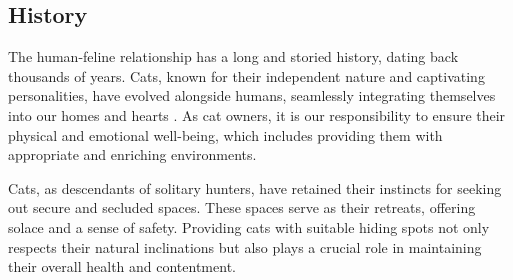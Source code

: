 \subsection{History}

The human-feline relationship has a long and storied history, dating back thousands of years. Cats, known for their independent nature and captivating personalities, have evolved alongside humans, seamlessly integrating themselves into our homes and hearts \cite{wiki:cat}. As cat owners, it is our responsibility to ensure their physical and emotional well-being, which includes providing them with appropriate and enriching environments.

Cats, as descendants of solitary hunters, have retained their instincts for seeking out secure and secluded spaces. These spaces serve as their retreats, offering solace and a sense of safety. Providing cats with suitable hiding spots not only respects their natural inclinations but also plays a crucial role in maintaining their overall health and contentment.

